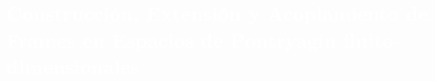 \begin{titlepage}
 \newcommand{\BH}{\mathcal{B}(\mathfrak{H})}
 \newcommand{\KH}{\mathcal{K}(\mathfrak{H})}
 \renewcommand{\ker}{\operatorname{ker}}
\newcommand{\Rang}{\operatorname{Rang}}
 \newcommand{\Real}{\mathbb{R}}
 \newcommand{\Entero}{\mathbb{Z}}
 \newcommand{\Complex}{\mathbb{C}}
 \newcommand{\Field}{\mathbb{F}}
\newcommand{\F}{\operatorname{F}}
 \newcommand{\RPlus}{\Real^{+}}
 \newcommand{\Polar}{\mathcal{P}_{\s}}
 \newcommand{\Poly}{\mathcal{P}(E)}
 \newcommand{\EssD}{\mathcal{D}}
 \newcommand{\Lpi}{L_{\infty}(0,\pi)}
 \newcommand{\Ele}{L_{2}}
 \newcommand{\Bergman}{\mathcal{A}^{2}}
 \newcommand{\States}{\mathcal{T}}
 \newcommand{\abs}[1]{\left\vert#1\right\vert}
 \newcommand{\set}[1]{\left\{#1\right\}}
 \newcommand{\seq}[1]{\left<#1\right>}
 \newcommand{\norm}[1]{\left\Vert#1\right\Vert}
 \newcommand{\essnorm}[1]{\norm{#1}_{\ess}}

\pagecolor{white}
\BgThispage
{}
\vspace*{-1.1cm}
\noindent
\def\titulo#1{\section{#1}}
\section{\bf\large\textcolor{white}{Construcci\'on, Extensi\'on y Acoplamiento de Frames en Espacios de Pontryagin finito-dimensionales}}

\vspace*{2cm}\par
\noindent


\end{titlepage}
